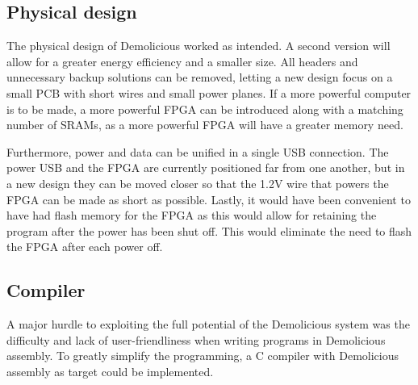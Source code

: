 \documentclass[../main/report.tex]{subfiles}
\begin{document}
\subsection{Physical design}
The physical design of Demolicious worked as intended.
A second version will allow for a greater energy efficiency and a smaller size.
All headers and unnecessary backup solutions can be removed, letting a new design focus on a small PCB with short wires and small power planes.
If a more powerful computer is to be made, a more powerful FPGA can be introduced along with a matching number of SRAMs, as a more powerful FPGA will have a greater memory need.

Furthermore, power and data can be unified in a single USB connection.
The power USB and the FPGA are currently positioned far from one another, but in a new design they can be moved closer so that the 1.2V wire that powers the FPGA can be made as short as possible.
Lastly, it would have been convenient to have had flash memory for the FPGA as this would allow for retaining the program after the power has been shut off.
This would eliminate the need to flash the FPGA after each power off.

\subsection{Compiler}

A major hurdle to exploiting the full potential of the Demolicious system was the difficulty and lack of user-friendliness when writing programs in Demolicious assembly.
To greatly simplify the programming, a C compiler with Demolicious assembly as target could be implemented.
\end{document}
